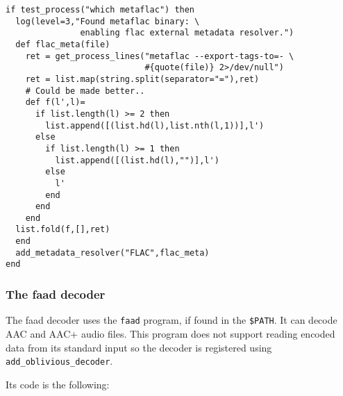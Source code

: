 \documentclass{book}
\begin{document}
\begin{verbatim}
if test_process("which metaflac") then
  log(level=3,"Found metaflac binary: \
               enabling flac external metadata resolver.")
  def flac_meta(file)
    ret = get_process_lines("metaflac --export-tags-to=- \
                            #{quote(file)} 2>/dev/null")
    ret = list.map(string.split(separator="="),ret)
    # Could be made better..
    def f(l',l)=
      if list.length(l) >= 2 then
        list.append([(list.hd(l),list.nth(l,1))],l')
      else
        if list.length(l) >= 1 then
          list.append([(list.hd(l),"")],l')
        else
          l'
        end
      end
    end
  list.fold(f,[],ret)
  end
  add_metadata_resolver("FLAC",flac_meta)
end
\end{verbatim}

\subsubsection{The faad decoder}
The faad decoder uses the \verb+faad+ program, if found in the \verb+$PATH+.  It
can decode AAC and AAC+ audio files. This program does not support reading
encoded data from its standard input so the decoder is registered using
\verb+add_oblivious_decoder+.

Its code is the following:


\end{document}

